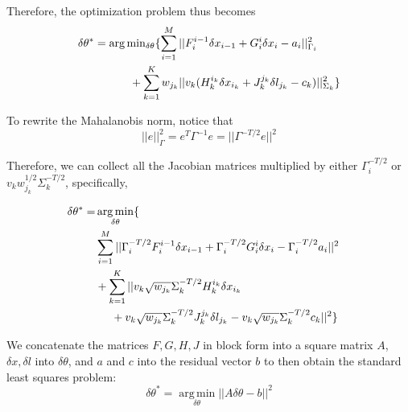 

Therefore, the optimization problem thus becomes
\begin{equation}
\begin{aligned}
\delta \theta^* = 
\operatorname*{arg\,min}&_{\delta \theta}\{\sum_{i=1}^M||F_i^{i-1}\delta x_{i-1} 
+ G_i^i\delta x_i - a_i||_{\Gamma_i}^2 \\ 
&\hspace{-0.5cm}+ \sum_{k=1}^Kw_{j_k}||v_k(H_k^{i_k}\delta x_{i_k} 
 + J_k^{j_k}\delta l_{j_k} - c_k)||_{\Sigma_k}^2\}
\end{aligned}
\end{equation}

To rewrite the Mahalanobis norm, notice that
\begin{equation}
||e||_{\Gamma}^2 = e^T\Gamma^{-1}e = ||\Gamma^{-T/2}e||^2
\end{equation}

Therefore, we can collect all the Jacobian matrices multiplied by either $\Gamma_i^{-T/2}$ or $v_k w_{j_k}^{1/2}\Sigma_k^{-T/2}$, specifically,

\begin{equation}
\begin{aligned}
\delta \theta^* =& \operatorname*{arg\,min}_{\delta \theta}\{&
\\ &\sum_{i=1}^M||\Gamma_i^{-T/2}F_i^{i-1}\delta x_{i-1} + \Gamma_i^{-T/2} G_i^i\delta x_i - \Gamma_i^{-T/2}a_i||^2  \\
&+\sum_{k=1}^K||v_k\sqrt{w_{j_k}}\Sigma_k^{-T/2} H_k^{i_k}\delta x_{i_k} 
\\ &\hspace{0.5cm}+ v_k\sqrt{w_{j_k}}\Sigma_k^{-T/2}J_k^{j_k}\delta l_{j_k} 
- v_k\sqrt{w_{j_k}}\Sigma_k^{-T/2}c_k||^2\}
\end{aligned}
\end{equation}

We concatenate the matrices $F, G, H, J$ in block form into a square matrix $A$, $\delta x, \delta l$ into $\delta \theta$, and $a$ and $c$ into the residual vector $b$ to then obtain the standard least squares problem:
\begin{equation}
\delta \theta^* = \operatorname*{arg\,min}_{\delta \theta}||A\delta \theta - b||^2
\end{equation}
